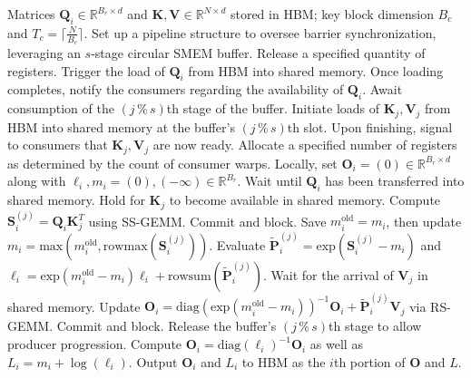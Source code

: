 \begin{algorithm}[H]
    \caption{\small\label{alg:flash3_wgmma_ws_only}\textsc{FlashAttention-3} forward pass \textbf{excluding} intra-consumer overlap -- CTA perspective}
    \begin{algorithmic}[1]
\REQUIRE Matrices $\mathbf{Q}_i \in \mathbb{R}^{B_r \times d}$ and $\mathbf{K}, \mathbf{V} \in \mathbb{R}^{N \times d}$ stored in HBM; key block dimension $B_c$ and $T_c = \lceil \frac{N}{B_c} \rceil$.
\STATE Set up a pipeline structure to oversee barrier synchronization, leveraging an $s$-stage circular SMEM buffer.
\STATE Release a specified quantity of registers.
\STATE Trigger the load of $\mathbf{Q}_i$ from HBM into shared memory.
\STATE Once loading completes, notify the consumers regarding the availability of $\mathbf{Q}_i$.
    \STATE Await consumption of the $(j\,\%\,s)$th stage of the buffer.
    \STATE Initiate loads of $\mathbf{K}_j, \mathbf{V}_j$ from HBM into shared memory at the buffer’s $(j\,\%\,s)$th slot.
    \STATE Upon finishing, signal to consumers that $\mathbf{K}_j, \mathbf{V}_j$ are now ready.
\ENDFOR
\ELSE \STATE Allocate a specified number of registers as determined by the count of consumer warps.
\STATE Locally, set $\mathbf{O}_i = (0) \in \mathbb{R}^{B_r \times d}$ along with $\ell_i, m_i = (0), (-\infty) \in \mathbb{R}^{B_r}$.
\STATE Wait until $\mathbf{Q}_i$ has been transferred into shared memory.
\STATE Hold for $\mathbf{K}_j$ to become available in shared memory.
\STATE Compute $\mathbf{S}_i^{(j)} = \mathbf{Q}_i \mathbf{K}_j^T$ using SS-GEMM. Commit and block. \label{alg:ws_only_gemm1}
\STATE Save $m_i^{\mathrm{old}} = m_i$, then update $m_i = \mathrm{max}(m_i^{\mathrm{old}}, \mathrm{rowmax}(\mathbf{S}_i^{(j)}))$. \label{code-ws:softmax_start}
\STATE Evaluate $\widetilde{\mathbf{P}}_i^{(j)} = \mathrm{exp}(\mathbf{S}_i^{(j)} - m_i)$ and $\ell_i = \mathrm{exp}(m_i^{\mathrm{old}} - m_i)\ell_i + \mathrm{rowsum}(\widetilde{\mathbf{P}}_i^{(j)})$. \label{code-ws:softmax_end}
\STATE Wait for the arrival of $\mathbf{V}_j$ in shared memory.
\STATE Update $\mathbf{O}_i = \mathrm{diag}(\mathrm{exp}(m_i^{\mathrm{old}} - m_i))^{-1} \mathbf{O}_i + \widetilde{\mathbf{P}}_i^{(j)} \mathbf{V}_j$ via RS-GEMM. Commit and block. \label{alg:ws_only_gemm2}
\STATE Release the buffer’s $(j\,\%\,s)$th stage to allow producer progression.
\ENDFOR
\STATE Compute $\mathbf{O}_i = \mathrm{diag}(\ell_i)^{-1}\mathbf{O}_i$ as well as $L_i = m_i + \log(\ell_i)$.
\STATE Output $\mathbf{O}_i$ and $L_i$ to HBM as the $i$th portion of $\mathbf{O}$ and $L$.
\ENDIF
\end{algorithmic}
\end{algorithm}

